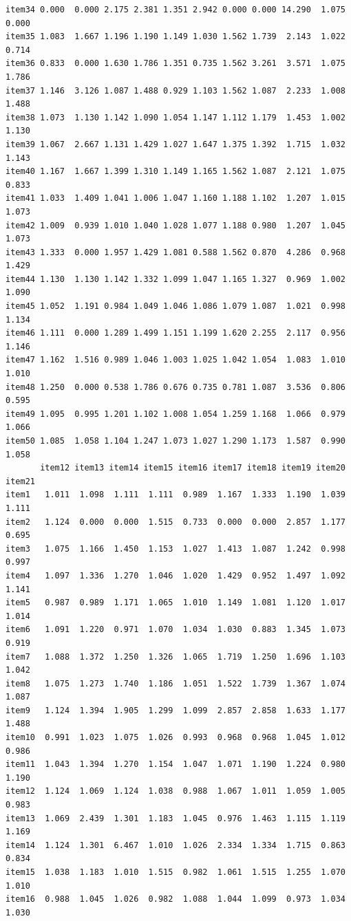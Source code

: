 \documentclass[
  a4paper,
]{ltjsbook}
\begin{document}
\begin{verbatim}
item34 0.000  0.000 2.175 2.381 1.351 2.942 0.000 0.000 14.290  1.075  0.000
item35 1.083  1.667 1.196 1.190 1.149 1.030 1.562 1.739  2.143  1.022  0.714
item36 0.833  0.000 1.630 1.786 1.351 0.735 1.562 3.261  3.571  1.075  1.786
item37 1.146  3.126 1.087 1.488 0.929 1.103 1.562 1.087  2.233  1.008  1.488
item38 1.073  1.130 1.142 1.090 1.054 1.147 1.112 1.179  1.453  1.002  1.130
item39 1.067  2.667 1.131 1.429 1.027 1.647 1.375 1.392  1.715  1.032  1.143
item40 1.167  1.667 1.399 1.310 1.149 1.165 1.562 1.087  2.121  1.075  0.833
item41 1.033  1.409 1.041 1.006 1.047 1.160 1.188 1.102  1.207  1.015  1.073
item42 1.009  0.939 1.010 1.040 1.028 1.077 1.188 0.980  1.207  1.045  1.073
item43 1.333  0.000 1.957 1.429 1.081 0.588 1.562 0.870  4.286  0.968  1.429
item44 1.130  1.130 1.142 1.332 1.099 1.047 1.165 1.327  0.969  1.002  1.090
item45 1.052  1.191 0.984 1.049 1.046 1.086 1.079 1.087  1.021  0.998  1.134
item46 1.111  0.000 1.289 1.499 1.151 1.199 1.620 2.255  2.117  0.956  1.146
item47 1.162  1.516 0.989 1.046 1.003 1.025 1.042 1.054  1.083  1.010  1.010
item48 1.250  0.000 0.538 1.786 0.676 0.735 0.781 1.087  3.536  0.806  0.595
item49 1.095  0.995 1.201 1.102 1.008 1.054 1.259 1.168  1.066  0.979  1.066
item50 1.085  1.058 1.104 1.247 1.073 1.027 1.290 1.173  1.587  0.990  1.058
       item12 item13 item14 item15 item16 item17 item18 item19 item20 item21
item1   1.011  1.098  1.111  1.111  0.989  1.167  1.333  1.190  1.039  1.111
item2   1.124  0.000  0.000  1.515  0.733  0.000  0.000  2.857  1.177  0.695
item3   1.075  1.166  1.450  1.153  1.027  1.413  1.087  1.242  0.998  0.997
item4   1.097  1.336  1.270  1.046  1.020  1.429  0.952  1.497  1.092  1.141
item5   0.987  0.989  1.171  1.065  1.010  1.149  1.081  1.120  1.017  1.014
item6   1.091  1.220  0.971  1.070  1.034  1.030  0.883  1.345  1.073  0.919
item7   1.088  1.372  1.250  1.326  1.065  1.719  1.250  1.696  1.103  1.042
item8   1.075  1.273  1.740  1.186  1.051  1.522  1.739  1.367  1.074  1.087
item9   1.124  1.394  1.905  1.299  1.099  2.857  2.858  1.633  1.177  1.488
item10  0.991  1.023  1.075  1.026  0.993  0.968  0.968  1.045  1.012  0.986
item11  1.043  1.394  1.270  1.154  1.047  1.071  1.190  1.224  0.980  1.190
item12  1.124  1.069  1.124  1.038  0.988  1.067  1.011  1.059  1.005  0.983
item13  1.069  2.439  1.301  1.183  1.045  0.976  1.463  1.115  1.119  1.169
item14  1.124  1.301  6.467  1.010  1.026  2.334  1.334  1.715  0.863  0.834
item15  1.038  1.183  1.010  1.515  0.982  1.061  1.515  1.255  1.070  1.010
item16  0.988  1.045  1.026  0.982  1.088  1.044  1.099  0.973  1.034  1.030

\end{verbatim}
\end{document}
